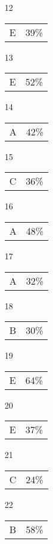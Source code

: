 \documentclass{article}
\begin{document}
\begin{multicols}{4}
\begin{enumerate}
    \item[12] \begin{tabular}{cc} E & 39\%\end{tabular}
    
    \item[13] \begin{tabular}{cc} E & 52\%\end{tabular}
    
    \item[14] \begin{tabular}{cc} A & 42\%\end{tabular}
    
    \item[15] \begin{tabular}{cc} C & 36\%\end{tabular}
    
       \item[]
    
    \item[16] \begin{tabular}{cc} A & 48\%\end{tabular}
    
    \item[17] \begin{tabular}{cc} A & 32\%\end{tabular}
    
    \item[18] \begin{tabular}{cc} B & 30\%\end{tabular}
    
    \item[19] \begin{tabular}{cc} E & 64\%\end{tabular}
    
    \item[20] \begin{tabular}{cc} E & 37\%\end{tabular}
    
       \item[]
    
    \item[21] \begin{tabular}{cc} C & 24\%\end{tabular}
    
    \item[22] \begin{tabular}{cc} B & 58\%\end{tabular}
    

\end{enumerate}
\end{multicols}
\end{document}
